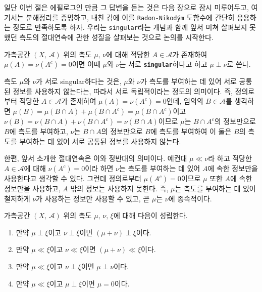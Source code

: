 일단 이번 절은 에필로그인 만큼 그 답변을 듣는 것은 다음 장으로 잠시 미루어두고, 여기서는 분해정리를 증명하고, 내친 김에 이를 \texttt{Radon-Nikod\'ym} 도함수에 간단히 응용하는 정도로 만족하도록 하자. 우리는 \texttt{singular}라는 개념과 함께 앞서 미쳐 살펴보지 못했던 측도의 절대연속에 관한 성질을 살펴보는 것으로 논의를 시작한다.

\begin{definition}
    가측공간 $(X,\,\mathcal{A})$ 위의 측도 $\mu,\,\nu$에 대해 적당한 $A\in\mathcal{A}$가 존재하여 $\mu(A)=\nu(A^c)=0$이면 이때 $\mu$와 $\nu$는 서로 \textbf{\texttt{singular}}하다고 하고 $\mu\perp\nu$로 쓴다.
\end{definition}

측도 $\mu$와 $\nu$가 서로 singular하다는 것은, $\mu$와 $\nu$가 측도를 부여하는 데 있어 서로 공통된 정보를 사용하지 않는다는, 따라서 서로 독립적이라는 정도의 의미이다. 즉, 정의로부터 적당한 $A\in\mathcal{A}$가 존재하여 $\mu(A)=\nu(A^c)=0$인데, 임의의 $B\in\mathcal{A}$를 생각하면 $\mu(B)=\mu(B\cap A)+\mu(B\cap A^c)=\mu(B\cap A^c)$이고 $\nu(B)=\nu(B\cap A)+\nu(B\cap A^c)=\nu(B\cap A)$이므로 $\mu$는 $B\cap A^c$의 정보만으로 $B$에 측도를 부여하고, $\nu$는 $B\cap A$의 정보만으로 $B$에 측도를 부여하여 이 둘은 $B$의 측도를 부여하는 데 있어 서로 공통된 정보를 사용하지 않는다.

한편, 앞서 소개한 절대연속은 이와 정반대의 의미이다. 예컨대 $\mu\ll\nu$라 하고 적당한 $A\in\mathcal{A}$에 대해 $\nu(A^c)=0$이라 하면 $\nu$는 측도를 부여하는 데 있어 $A$에 속한 정보만을 사용한다고 생각할 수 있다. 그런데 정의로부터 $\mu(A^c)=0$이므로 $\mu$ 또한 $A$에 속한 정보만을 사용하고, $A$ 밖의 정보는 사용하지 못한다. 즉, $\mu$는 측도를 부여하는 데 있어 철저하게 $\nu$가 사용하는 정보만 사용할 수 있고, 곧 $\mu$는 $\nu$에 종속적이다.

\begin{proposition}\label{prop:singularMeasure}
    가측공간 $(X,\,\mathcal{A})$ 위의 측도 $\mu,\,\nu,\,\xi$에 대해 다음이 성립한다.
    \begin{enumerate}
        \item 만약 $\mu\perp\xi$이고 $\nu\perp\xi$이면 $(\mu+\nu)\perp\xi$이다.
        \item 만약 $\mu\ll\xi$이고 $\nu\ll\xi$이면 $(\mu+\nu)\ll\xi$이다.
        \item 만약 $\mu\ll\xi$이고 $\nu\perp\xi$이면 $\mu\perp\nu$이다.
        \item 만약 $\mu\ll\xi$이고 $\mu\perp\xi$이면 $\mu=0$이다. 
    \end{enumerate}
\end{proposition}

